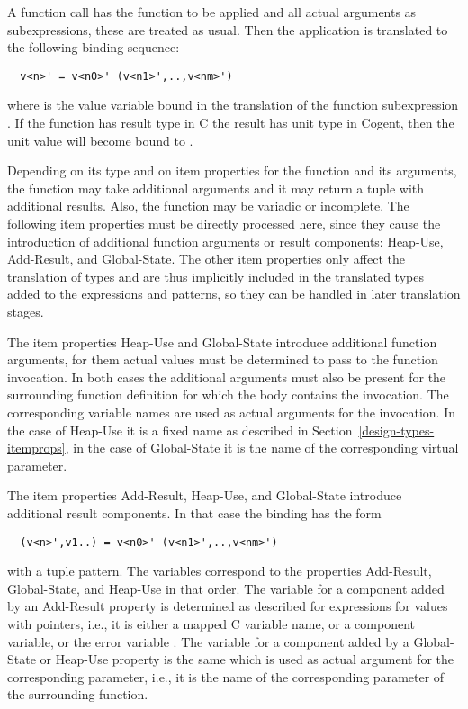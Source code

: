 A function call  has the function  to be applied and all actual arguments as subexpressions,
these are treated as usual. Then the application is translated to the following binding sequence:
\begin{verbatim}
  v<n>' = v<n0>' (v<n1>',..,v<nm>')
\end{verbatim}
where  is the value variable bound in the translation of the function subexpression .
If the function has result type
 in C the result has unit type in Cogent, then the unit value will become bound to .

Depending on its type and on item properties for the function and its arguments, the function may take additional arguments and
it may return a tuple with additional results. Also, the function may be variadic or incomplete. The following item properties
must be directly processed here, since they cause the introduction of additional function arguments or result components:
Heap-Use, Add-Result, and Global-State. The other item properties only affect the translation of types and are thus implicitly
included in the translated types added to the expressions and patterns, so they can be handled in later translation stages.

The item properties Heap-Use and Global-State introduce additional function arguments, for them actual values must be determined
to pass to the function invocation. In both cases the additional arguments must also be present for the surrounding function
definition for which the body contains the invocation. The corresponding variable names are used as actual arguments for the
invocation. In the case of Heap-Use it is a fixed name as described in Section~\ref{design-types-itemprops}, in the case of
Global-State it is the name of the corresponding virtual parameter.

The item properties Add-Result, Heap-Use, and Global-State introduce additional result components. In that case the binding has 
the form
\begin{verbatim}
  (v<n>',v1..) = v<n0>' (v<n1>',..,v<nm>')
\end{verbatim}
with a tuple pattern. The variables  correspond to the properties Add-Result, Global-State, and Heap-Use in that order.
The variable for a component added by an Add-Result property is determined as described for expressions for values with pointers,
i.e., it is either a mapped C variable name, or a component variable, or the error variable . The variable for a component
added by a Global-State or Heap-Use property is the same which is used as actual argument for the corresponding parameter, i.e.,
it is the name of the corresponding parameter of the surrounding function.

